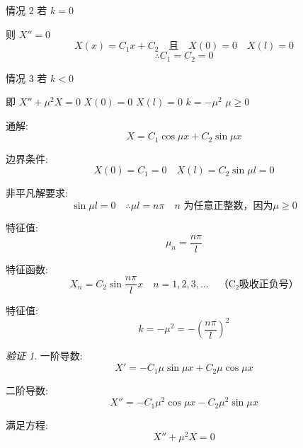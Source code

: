 \documentclass[12pt,a4paper]{article}
\numberwithin{subsection}{section}   %
\numberwithin{subsubsection}{subsection}
\theoremstyle{plain}
\theoremstyle{definition}
\theoremstyle{remark}
\theoremstyle{remark}
\newtheorem{verification}[theorem]{验证}
\begin{document}
	
情况 2 \quad 若 \(k = 0\)

则 \(X'' = 0\)
	\begin{equation}
		X(x) = C_1 x + C_2 \quad \text{且} \quad X(0) = 0 \quad X(l) = 0
	\end{equation}
	\begin{equation}
		\therefore C_1 = C_2 = 0
	\end{equation}
	
情况 3 \quad 若 \(k < 0\)

即 \(X'' + \mu^2 X = 0\) \quad \(X(0) = 0\) \quad \(X(l) = 0\) \quad \(k = -\mu^2\)  \quad \(\mu \geq 0\)
	
	通解:
	\begin{equation}
		X = C_1 \cos \mu x + C_2 \sin \mu x
	\end{equation}
	
	
	
	边界条件:
	\begin{equation}
		X(0) = C_1 = 0 \quad X(l) = C_2 \sin \mu l = 0
	\end{equation}
	
	非平凡解要求:
	\begin{equation*}
		\sin \mu l = 0 \quad \therefore \mu l = n\pi \quad n \text{ 为任意正整数，因为$\mu \geq 0$}
	\end{equation*}
	
	特征值:
	\begin{equation}
		\mu_n = \frac{n\pi}{l}
	\end{equation}
	
	特征函数:
	\begin{equation}
		X_n = C_2 \sin \frac{n\pi}{l} x \quad n = 1, 2, 3, \ldots \quad \text{（C₂吸收正负号）}
	\end{equation}
	
	特征值:
	\begin{equation}
		k = -\mu^2 = -\left(\frac{n\pi}{l}\right)^2
	\end{equation}
	
	\begin{verification}	
		一阶导数:
		\begin{equation*}
			X' = -C_1 \mu \sin \mu x + C_2 \mu \cos \mu x
		\end{equation*}
		
		二阶导数:
		\begin{equation*}
			X'' = -C_1 \mu^2 \cos \mu x - C_2 \mu^2 \sin \mu x
		\end{equation*}
		
		满足方程:
		\begin{equation*}
			X'' + \mu^2 X = 0
		\end{equation*}
	\end{verification}	
	
\end{document}
